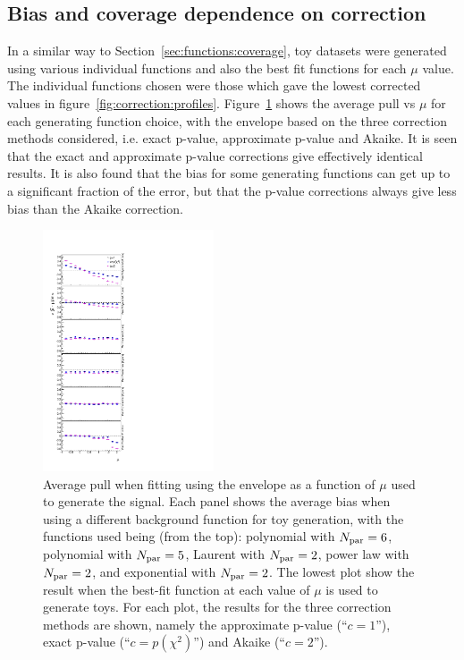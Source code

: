 


\subsection{Bias and coverage dependence on correction}
\label{sec:correction:bias}

In a similar way to Section~\ref{sec:functions:coverage}, toy datasets
were generated using various individual functions and also the best fit
functions for each $\mu$ value. The individual functions chosen were those
which gave the lowest corrected \nll values in 
figure~\ref{fig:correction:profiles}.
Figure~\ref{fig:correction:allorderbias} shows the average pull vs $\mu$
for each generating function choice, with the envelope based on the
three correction methods considered, i.e. exact p-value, approximate p-value
and Akaike. It is seen that the exact and approximate p-value corrections give
effectively identical results. It is also found that the bias for some
generating functions can get up to a significant fraction of the error, but
that the p-value corrections always give less bias than the Akaike correction.
%
\begin{figure}[tbp]
\centering
\includegraphics[width=0.45\textwidth]{correction/AllOrderFunctions_call.pdf}
\caption{Average pull when fitting using the envelope as a function of $\mu$ 
used to generate the signal. Each panel shows the average bias when using 
a different background function for toy generation, with the functions
used being (from the top): polynomial with $N_{\rm par}=6$,
polynomial with $N_{\rm par}=5$, Laurent with $N_{\rm par}=2$,
power law with $N_{\rm par}=2$, and exponential with $N_{\rm par}=2$.
The lowest plot show the result when the best-fit function at each
value of $\mu$ is used to generate toys.
For each plot, the results for the three correction methods are shown,
namely the approximate p-value (``$c=1$''), exact p-value (``$c=p(\chi^2)$'')
and Akaike (``$c=2$'').}
\label{fig:correction:allorderbias}
\end{figure}

